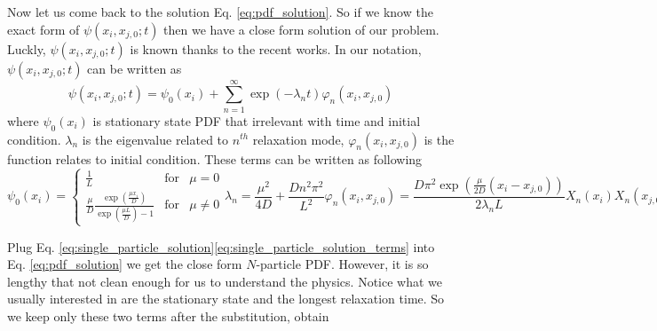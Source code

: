 \documentclass[12pt,a4paper]{article}
\begin{document}
Now let us come back to the solution Eq. \eqref{eq:pdf_solution}. So if we know
the exact form of $\psi(x_i,x_{j,0};t)$ then we have a close form solution of
our problem. Luckly, $\psi(x_i,x_{j,0};t)$ is known thanks to the recent works\cite{}.
In our notation, $\psi(x_i,x_{j,0};t)$ can be written as
\begin{equation}
    \label{eq:single_particle_solution}
    \psi(x_i,x_{j,0};t) = \psi_0(x_{i}) + \sum_{n=1}^\infty\exp(-\lambda_n
    t)\varphi_n(x_{i}, x_{j,0})
\end{equation}
where $\psi_0(x_{i})$ is stationary state PDF that irrelevant with time and
initial condition. $\lambda_n$ is the eigenvalue related to $n^{th}$
relaxation mode, $\varphi_n(x_i, x_{j,0})$ is the function relates to initial
condition. These terms can be written as following
\begin{subequations}
    \label{eq:single_particle_solution_terms}
    \begin{equation}
        \psi_0(x_i) = \left\{\begin{array}{ccl} \frac{1}{L} & \mbox{for} & \mu=0 \\
                \frac{\mu}{D}\frac{\exp(\frac{\mu x_i}{D})}{\exp(\frac{\mu L}{D})-1}
                    & \mbox{for} & \mu\neq 0 \end{array}\right.
    \end{equation}
    \begin{equation}
        \lambda_n = \frac{\mu^2}{4D} + \frac{Dn^2\pi^2}{L^2}
    \end{equation}
    \begin{equation}
        \varphi_n(x_i, x_{j,0}) =
        \frac{D\pi^2\exp(\frac{\mu}{2D}(x_i-x_{j,0}))}{2\lambda_n L}X_n(x_i)
        X_n(x_{j,0})
    \end{equation}
    \begin{equation}
        X_n(x) = \frac{2n}{L}\cos(\frac{n\pi x}{L}) + \frac{\mu}{D\pi}\sin(\frac{n\pi x}{L})
    \end{equation}
\end{subequations}

Plug Eq.
\eqref{eq:single_particle_solution}\eqref{eq:single_particle_solution_terms}
into Eq. \eqref{eq:pdf_solution} we get the close form $N$-particle PDF.
However, it is so lengthy that not clean enough for us to understand the
physics. Notice what we usually interested in are the stationary state and the
longest relaxation time. So we keep only these two terms after the
substitution, obtain
\end{document}
